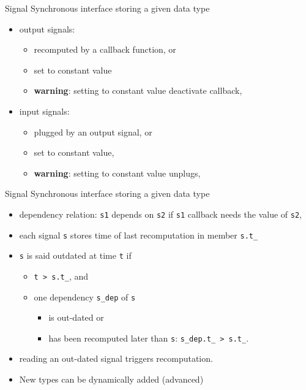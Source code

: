 %
%
\begin {frame} {Signal}
  Synchronous interface storing a given data type
  \begin{itemize}
  \item output signals:
    \begin{itemize}
    \item recomputed by a callback function, or
    \item set to constant value
    \pause
    \item \textbf{warning}: setting to constant value deactivate callback,
    \end{itemize}
    \pause
  \item input signals:
    \begin{itemize}
    \item plugged by an output signal, or
    \item set to constant value,
    \pause
    \item \textbf{warning}: setting to constant value unplugs,
    \end{itemize}
  \end{itemize}
\end {frame}

%
%
\begin {frame} {Signal}
  Synchronous interface storing a given data type
  \begin{itemize}
  \item dependency relation: \texttt{s1} depends on \texttt{s2} if \texttt{s1} callback needs the value of \texttt{s2},
    \pause
  \item each signal \texttt{s} stores time of last recomputation in member \texttt{s.t\_}
    \pause
  \item \texttt{s} is said outdated at time \texttt{t} if
    \begin{itemize}
    \item \texttt{t > s.t\_}, and
      \pause
    \item one dependency \texttt{s\_dep} of \texttt{s}
      \begin{itemize}
      \item is out-dated or
      \item has been recomputed later than \texttt{s}: \texttt{s\_dep.t\_ > s.t\_}.
      \end{itemize}
    \end{itemize}
    \pause
  \item reading an out-dated signal triggers recomputation.
    \pause
  \item New types can be dynamically added  (advanced)
  \end{itemize}
\end {frame}

